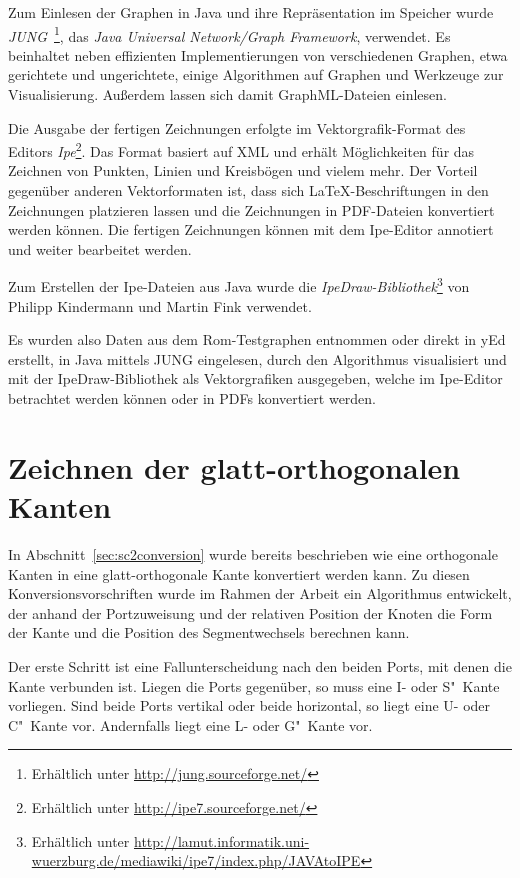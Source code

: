 \documentclass[a4paper]{scrreprt}
\theoremstyle{definition}
\begin{document}
Zum Einlesen der Graphen in Java und ihre Repräsentation im Speicher wurde \emph{JUNG}~\cite{jung}\footnote{Erhältlich unter \url{http://jung.sourceforge.net/}}, das \emph{Java Universal Network/Graph Framework}, verwendet. Es beinhaltet neben effizienten Implementierungen von verschiedenen Graphen, etwa gerichtete und ungerichtete, einige Algorithmen auf Graphen und Werkzeuge zur Visualisierung. Außerdem lassen sich damit GraphML-Dateien einlesen.

Die Ausgabe der fertigen Zeichnungen erfolgte im Vektorgrafik-Format des Editors \emph{Ipe}\footnote{Erhältlich unter \url{http://ipe7.sourceforge.net/}}. Das Format basiert auf XML und erhält Möglichkeiten für das Zeichnen von Punkten, Linien und Kreisbögen und vielem mehr. Der Vorteil gegenüber anderen Vektorformaten ist, dass sich \LaTeX-Beschriftungen in den Zeichnungen platzieren lassen und die Zeichnungen in PDF-Dateien konvertiert werden können. Die fertigen Zeichnungen können mit dem Ipe-Editor annotiert und weiter bearbeitet werden.

Zum Erstellen der Ipe-Dateien aus Java wurde die \emph{IpeDraw-Bibliothek}\footnote{Erhältlich unter \url{http://lamut.informatik.uni-wuerzburg.de/mediawiki/ipe7/index.php/JAVAtoIPE}} von Philipp Kindermann und Martin Fink verwendet.

Es wurden also Daten aus dem Rom-Testgraphen entnommen oder direkt in yEd erstellt, in Java mittels JUNG eingelesen, durch den Algorithmus visualisiert und mit der IpeDraw-Bibliothek als Vektorgrafiken ausgegeben, welche im Ipe-Editor betrachtet werden können oder in PDFs konvertiert werden.

\section{Zeichnen der glatt-orthogonalen Kanten}

In Abschnitt~\ref{sec:sc2conversion} wurde bereits beschrieben wie eine orthogonale Kanten in eine glatt-orthogonale Kante konvertiert werden kann. Zu diesen Konversionsvorschriften wurde im Rahmen der Arbeit ein Algorithmus entwickelt, der anhand der Portzuweisung und der relativen Position der Knoten die Form der Kante und die Position des Segmentwechsels berechnen kann. 

Der erste Schritt ist eine Fallunterscheidung nach den beiden Ports, mit denen die Kante verbunden ist. Liegen die Ports gegenüber, so muss eine I- oder S"~Kante vorliegen. Sind beide Ports vertikal oder beide horizontal, so liegt eine U- oder C"~Kante vor. Andernfalls liegt eine L- oder G"~Kante vor.
\end{document}
